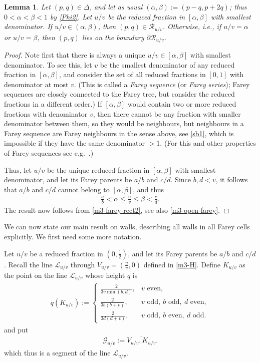 \documentclass[11pt,reqno,tbtags,a4paper]{amsart}
\numberwithin{equation}{section}
\renewcommand\le{\leq}
\renewcommand\leq{\leqslant}
\theoremstyle{plain}%
\newtheorem{lemma}[theorem]{Lemma}
\theoremstyle{definition}
\theoremstyle{remark}
\newcounter{cases}
\newcommand\ga{\alpha}
\newcommand\gb{\beta}
\newcommand\gD{\Delta}
\newcommand\LL{{\mathcal L}}
\newcommand\LG{{\mathcal G}} %
\newcommand\cR{{\mathcal R}}
\newcommand\uv{_{u/v}}
\newcommand\linje[1]{\overline{#1}}
\newcommand\0{{\boldsymbol 0}}
\newcommand\1{{\boldsymbol 1}}
\begin{document}
\begin{lemma}\label{LUV}
  Let $(p,q)\in\gD$, and let as usual $(\ga,\gb):=(p-q,p+2q)$;
 thus $0<\ga<\gb<1$ by \eqref{Phi2}. %
Let $u/v$ be the reduced fraction in $[\ga,\gb]$ with smallest denominator. 
If $u/v\in(\ga,\gb)$, then $(p,q)\in\cR_{u/v}$.
Otherwise, i.e., if $u/v=\ga$ or $u/v=\gb$, then $(p,q)$ lies on the boundary
$\partial\cR_{u/v}$. 
\end{lemma}
\begin{proof}
  Note first that there is always a unique $u/v \in[\ga,\gb]$ with smallest
  denominator. 
To see this, 
let $v$ be the smallest denominator of any reduced fraction in $[\ga,\gb]$,
and consider the set of all reduced fractions in $[0,1]$ with denominator at
most $v$. 
(This is called a \emph{Farey sequence} (or \emph{Farey series}); 
Farey sequences are closely connected to the Farey tree, but consider the
reduced fractions in a different order.)
If $[\ga,\gb]$ would contain two or more reduced fractions with denominator
$v$, then there cannot be any fraction with smaller denominator between them, so
they would be neighbours, but neighbours in a Farey sequence are Farey
neighbours in the sense above, see \eqref{sb1}, which is impossible if they
have the same denominator $>1$.
(For this and other properties of Farey sequences
see e.g.\ \cite[p.~118--119]{CM}.)
%

Thus, let $u/v$ be the unique reduced fraction in $[\ga,\gb]$ with
smallest denominator, and let its Farey parents be $a/b$ and $c/d$.
Since $b,d<v$, it follows that $a/b$ and $c/d$ cannot belong to $[\ga,\gb]$,
and thus
\begin{align}\label{jz0}
  \frac ab <\ga \le \frac uv \le\gb <\frac cd.
\end{align}
The result now follows from \eqref{m3-farey-rect2}, see also
\eqref{m3-open-farey}. 
\end{proof}


We can now state our main result on walls, describing all walls in
all Farey cells explicitly. We first need some more notation.

Let $u/v$ be a reduced fraction in $(0,\frac12)$,
and let its Farey parents be $a/b$ and $c/d$.
Recall the line $\LL\uv$ through $V\uv=(\frac uv,0)$ defined in
\eqref{m3-H}. %
Define $K_{u/v}$ as the point on the line $\LL\uv$ whose height $q$ is
\begin{align}\label{qK}
 q(K_{u/v}):=
  \begin{cases}
\displaystyle\frac{2}{3v \min(b,d)},
        & v \text{ even},\\[5pt]
\displaystyle\frac{2}{3b(b+v)},
        & v \text{ odd},\ b \text{ odd},\ d \text{ even},\\[5pt]
\displaystyle\frac{2}{3d(d+v)},
        & v \text{ odd},\ b \text{ even},\ d \text{ odd}.
\end{cases}
\end{align}
and put
\begin{align}\label{guv}
 \LG_{u/v}:=\linje{V_{u/v},K_{u/v}}.
\end{align}
which thus is a segment of the line $\LL\uv$.
\end{document}
